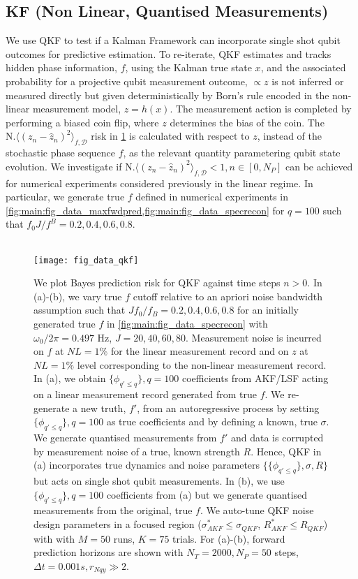 \documentclass[pra, reprint]{revtex4-1}
\begin{document}
\subsection{KF (Non Linear, Quantised Measurements)}
We use QKF to test if a Kalman Framework can incorporate single shot qubit outcomes for predictive estimation. To re-iterate, QKF estimates and tracks hidden phase information, $f$, using the Kalman true state $x$, and the associated probability for a projective qubit measurement outcome, $\propto z$ is not inferred or measured directly but given deterministically by Born's rule encoded in the non-linear measurement model, $z = h(x)$. The measurement action is completed by performing a biased coin flip, where $z$ determines the bias of the coin.  The $\text{N.} \langle (z_n - \hat{z}_n)^2 \rangle_{f, \mathcal{D}} $ risk in  \cref{fig:main:fig_data_qkf2} is calculated with respect to  $z$, instead of the stochastic phase sequence $f$, as the relevant quantity parametering qubit state evolution. We investigate if $\text{N.} \langle (z_n - \hat{z}_n)^2 \rangle_{f, \mathcal{D}} < 1, n\in [0, N_P] $ can be achieved for numerical experiments considered previously in the linear regime. In particular, we generate true $f$ defined in numerical experiments in \cref{fig:main:fig_data_maxfwdpred,fig:main:fig_data_specrecon} for $q=100$ such that $f_0 J / f^B = 0.2, 0.4, 0.6, 0.8$.  
\\
\\
\begin{figure}[h!]
    \texttt{[image: fig\_data\_qkf]}
    \caption{\label{fig:main:fig_data_qkf2} We plot Bayes prediction risk for QKF against time steps $n>0$. In (a)-(b), we vary true $f$ cutoff relative to an apriori noise bandwidth assumption such that $J f_0 / f_B = 0.2, 0.4, 0.6, 0.8$ for an initially generated true $f$ in \cref{fig:main:fig_data_specrecon} with $\omega_0/ 2\pi = 0.497 $ Hz, $J = 20, 40, 60, 80$. Measurement noise is incurred on $f$ at $NL = 1 \%$ for the linear measurement record and on $z$ at $NL = 1\%$ level corresponding to the non-linear measurement record. In (a), we obtain $\{\phi_{q' \leq q}\}, q=100$ coefficients from AKF/LSF acting on a linear measurement record generated from true $f$. We re-generate a new truth, $f'$, from an autoregressive process by setting $\{\phi_{q'\leq q}\}, q=100$ as true coefficients and by defining a known, true $\sigma$. We generate quantised measurements from $f'$ and data is corrupted by measurement noise of a true, known strength $R$. Hence, QKF in (a) incorporates true dynamics and noise parameters $\{\{\phi_{q' \leq q} \}, \sigma, R\}$ but acts on single shot qubit measurements. In (b), we use $\{\phi_{q' \leq q} \}, q=100$ coefficients from (a) but we generate quantised measurements from the original, true $f$. We auto-tune QKF noise design parameters in a focused region ($\sigma_{AKF}^* \leq \sigma_{QKF}$, $R_{AKF}^* \leq R_{QKF}$) with with $M=50$ runs, $K=75$ trials. For (a)-(b), forward prediction horizons are shown with $N_T = 2000, N_P = 50$ steps, $\Delta t = 0.001s, r_{Nqy}\gg 2$.}
\end{figure}
\end{document}
